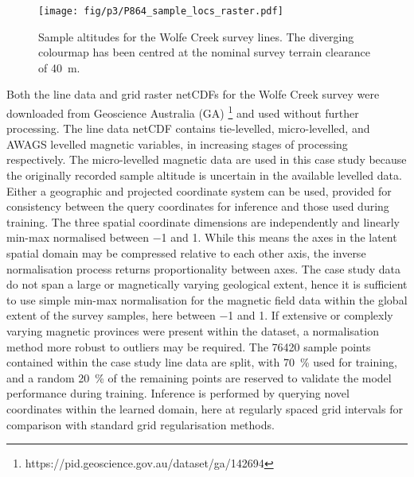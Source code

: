 \begin{figure}[hbtp]
    \centering{}
    \texttt{[image: fig/p3/P864\_sample\_locs\_raster.pdf]}
    \caption[The Wolfe Creek Meteorite Crater survey]{Sample altitudes for the Wolfe Creek survey lines. The diverging colourmap has been centred at the nominal survey terrain clearance of \qty{40}{\m}.}
    \label{fig:samples}
\end{figure}

Both the line data and grid raster netCDFs for the Wolfe Creek survey were downloaded from Geoscience Australia (GA) \footnote{https://pid.geoscience.gov.au/dataset/ga/142694} and used without further processing.
The line data netCDF contains tie-levelled, micro-levelled, and AWAGS levelled magnetic variables, in increasing stages of processing respectively.
The micro-levelled magnetic data are used in this case study because the originally recorded sample altitude is uncertain in the available levelled data.
Either a geographic and projected coordinate system can be used, provided for consistency between the query coordinates for inference and those used during training.
The three spatial coordinate dimensions are independently and linearly min-max normalised between \num{-1} and \num{1}.
While this means the axes in the latent spatial domain may be compressed relative to each other axis, the inverse normalisation process returns proportionality between axes.
The case study data do not span a large or magnetically varying geological extent, hence it is sufficient to use simple min-max normalisation for the magnetic field data within the global extent of the survey samples, here between \num{-1} and \num{1}.
If extensive or complexly varying magnetic provinces were present within the dataset, a normalisation method more robust to outliers may be required.
The \num{76420} sample points contained within the case study line data are split, with \qty{70}{\percent} used for training, and a random \qty{20}{\percent} of the remaining points are reserved to validate the model performance during training.
Inference is performed by querying novel coordinates within the learned domain, here at regularly spaced grid intervals for comparison with standard grid regularisation methods.

